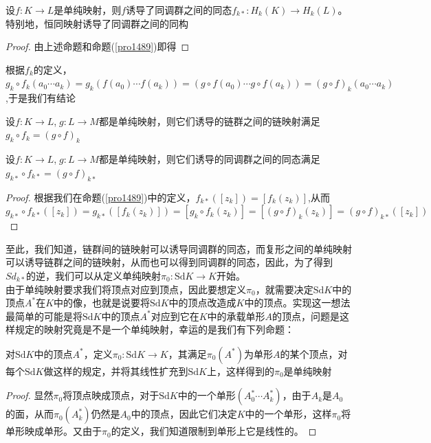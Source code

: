\begin{corollary}
设$f:K\rightarrow L$是单纯映射，则$f$诱导了同调群之间的同态$f_{k*}:H_{k}(K)\rightarrow H_{k}(L)$。特别地，恒同映射诱导了同调群之间的同构
\end{corollary}
\begin{proof}
由上述命题和命题(\ref{pro1489})即得
\end{proof}
根据$f_{k}$的定义，$g_{k}\circ f_{k}(a_{0}\cdots a_{k})=g_{k}(f(a_{0})\cdots f(a_{k}))=(g\circ f(a_{0})\cdots g\circ f(a_{k}))=(g\circ f)_{k}(a_{0}\cdots a_{k})$,于是我们有结论
\begin{proposition}
设$f:K\rightarrow L$,$\;g:L\rightarrow M$都是单纯映射，则它们诱导的链群之间的链映射满足$g_{k}\circ f_{k}=(g\circ f)_{k}$
\end{proposition}
\begin{corollary}\label{lemma1558}
设$f:K\rightarrow L$,$\;g:L\rightarrow M$都是单纯映射，则它们诱导的同调群之间的同态满足$g_{k*}\circ f_{k*}=(g\circ f)_{k*}$
\end{corollary}
\begin{proof}
根据我们在命题(\ref{pro1489})中的定义，$f_{k*}([z_{k}])=[f_{k}(z_{k})]$,从而$g_{k*}\circ f_{k*}([z_{k}])=g_{k*}([f_{k}(z_{k})])=[g_{k}\circ f_{k}(z_{k})]=[(g\circ f)_{k}(z_{k})]=(g\circ f)_{k*}([z_{k}])$
\end{proof}
至此，我们知道，链群间的链映射可以诱导同调群的同态，而复形之间的单纯映射可以诱导链群之间的链映射，从而也可以得到同调群的同态，因此，为了得到$Sd_{k*}$的逆，我们可以从定义单纯映射$\pi_{0}:\text{Sd}K\rightarrow K$开始。\\
由于单纯映射要求我们将顶点对应到顶点，因此要想定义$\pi_{0}$，就需要决定$\text{Sd}K$中的顶点$A^{*}$在$K$中的像，也就是说要将$\text{Sd}K$中的顶点改造成$K$中的顶点。实现这一想法最简单的可能是将$\text{Sd}K$中的顶点$A^{*}$对应到它在$K$中的承载单形$A$的顶点，问题是这样规定的映射究竟是不是一个单纯映射，幸运的是我们有下列命题：
\begin{proposition}
对$\text{Sd}K$中的顶点$A^{*}$，定义$\pi_{0}:\text{Sd}K\rightarrow K$，其满足$\pi_{0}(A^{*})$为单形$A$的某个顶点，对每个$\text{Sd}K$做这样的规定，并将其线性扩充到$\text{Sd}K$上，这样得到的$\pi_{0}$是单纯映射
\end{proposition}
\begin{proof}
显然$\pi_{0}$将顶点映成顶点，对于$\text{Sd}K$中的一个单形$(A_{0}^{*}\cdots A_{k}^{*})$，由于$A_{k}$是$A_{0}$的面，从而$\pi_{0}(A^{*}_{k})$仍然是$A_{0}$中的顶点，因此它们决定$K$中的一个单形，这样$\pi_{0}$将单形映成单形。又由于$\pi_{0}$的定义，我们知道限制到单形上它是线性的。
\end{proof}
